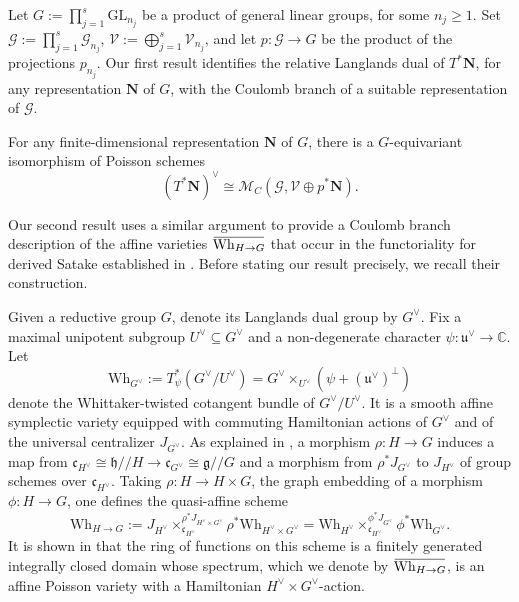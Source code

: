 \documentclass[11pt]{amsart}
\theoremstyle{definition}
\theoremstyle{plain}
\theoremstyle{remark}
\newcommand{\GL}{\mathrm{GL}}
\newcommand{\numberset}{\mathbb}
\newcommand{\C}{\numberset{C}}
\newcommand{\g}{\mathfrak{g}}
\newcommand{\git}{/\!\!/}
\newcommand{\overbar}[1]{\mkern 1.5mu\overline{\mkern-1.5mu#1\mkern-1.5mu}\mkern 1.5mu}
\newcommand{\hh}{\mathfrak{h}}
\begin{document}
    Let $G := \prod_{j=1}^s\GL_{n_j}$ be a product of general linear groups, for some $n_j\geq 1$. Set $\mathcal{G} := \prod_{j=1}^s\mathcal{G}_{n_j}$, $\mathcal{V}:=\bigoplus_{j=1}^s\mathcal{V}_{n_j}$, and let $p\colon \mathcal{G} \to G$ be the product of the projections $p_{n_j}$. Our first result identifies the relative Langlands dual of $T^*\mathbf{N}$, for any representation $\mathbf{N}$ of $G$, with the Coulomb branch of a suitable representation of $\mathcal{G}$.

    \begin{thm}\label{thm-1}
        For any finite-dimensional representation $\mathbf{N}$ of $G$, there is a  $G$-equivariant isomorphism of Poisson schemes
        \[
            (T^*\mathbf{N})^\vee \cong \mathcal{M}_C(\mathcal{G}, \mathcal{V} \oplus p^*\mathbf{N}).
        \]
    \end{thm}

    Our second result uses a similar argument to provide a Coulomb branch description of the affine varieties $\overbar{\mathrm{Wh}_{H \to G}}$ that occur in the functoriality for derived Satake established in \cite[Section 2]{ginzburg2025pointwisepurityderivedsatake}. Before stating our result precisely, we recall their construction. 
    
    Given a reductive group $G$, denote its Langlands dual group by $G^\vee$. Fix a maximal unipotent subgroup $U^\vee \subseteq G^\vee$ and a non-degenerate character $\psi\colon \mathfrak{u}^\vee \to \C$. Let 
    \[
        \mathrm{Wh}_{G^\vee} := T^*_{\psi}(G^\vee/U^\vee) = G^\vee \times_{U^\vee} (\psi + (\mathfrak{u}^\vee)^\perp)
    \]
    denote the Whittaker-twisted cotangent bundle of $G^\vee/U^\vee$. It is a smooth affine symplectic variety equipped with commuting Hamiltonian actions of $G^\vee$ and of the universal centralizer $J_{G^\vee}$. As explained in \cite{ginzburg2025pointwisepurityderivedsatake}, a morphism $\rho\colon H \to G$ induces a map from $\mathfrak{c}_{H^\vee} \cong \hh\git H \to \mathfrak{c}_{G^\vee} \cong \g\git G$ and a morphism from $\rho^*J_{G^\vee}$ to $J_{H^\vee}$ of group schemes over $\mathfrak{c}_{H^\vee}$. Taking $\rho\colon H \to H \times G$, the graph embedding of a morphism $\phi\colon H \to G$, one defines the quasi-affine scheme
    \[
        \mathrm{Wh}_{H \to G} := J_{H^\vee} \times_{\mathfrak{c}_{H^\vee}}^{\rho^*J_{H^\vee \times G^\vee}} \rho^*\mathrm{Wh}_{H^\vee \times G^\vee} = \mathrm{Wh}_{H^\vee} \times_{\mathfrak{c}_{H^\vee}}^{\phi^*J_{G^\vee}} \phi^*\mathrm{Wh}_{G^\vee} .
    \]
    It is shown in \cite[Theorem 2.1.2]{ginzburg2025pointwisepurityderivedsatake} that the ring of functions on this scheme is a finitely generated integrally closed domain whose spectrum, which we denote by $\overbar{\mathrm{Wh}_{H \to G}}$, is an affine Poisson variety with a Hamiltonian $H^\vee \times G^\vee$-action.
     
\end{document}
